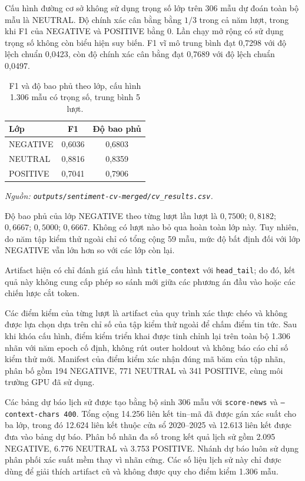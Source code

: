 \documentclass[12pt, a4paper, oneside]{report}
\begin{document}
Cấu hình đường cơ sở không sử dụng trọng số lớp trên 306 mẫu dự đoán toàn bộ mẫu là
NEUTRAL. Độ chính xác cân bằng bằng $1/3$ trong cả năm lượt, trong khi F1 của NEGATIVE và
POSITIVE bằng 0. Lần chạy mở rộng có sử dụng trọng số không còn biểu hiện suy biến. F1 vĩ
mô trung bình đạt 0,7298 với độ lệch chuẩn 0,0423, còn độ chính xác cân bằng đạt 0,7689
với độ lệch chuẩn 0,0497.

\begin{table}[H]
  \centering
  \caption{F1 và độ bao phủ theo lớp, cấu hình 1.306 mẫu có trọng số, trung bình 5 lượt.}
  \label{tab:kq-sentiment-class}
  \begin{tabular}{l c c}
    \toprule
    Lớp & F1 & Độ bao phủ \\
    \midrule
    NEGATIVE & 0,6036 & 0,6803 \\
    NEUTRAL & 0,8816 & 0,8359 \\
    POSITIVE & 0,7041 & 0,7906 \\
    \bottomrule
  \end{tabular}
\noindent\textit{Nguồn: \texttt{outputs/sentiment-cv-merged/cv\_results.csv}.}
\end{table}

Độ bao phủ của lớp NEGATIVE theo từng lượt lần lượt là $0{,}7500$; $0{,}8182$;
$0{,}6667$; $0{,}5000$; $0{,}6667$. Không có lượt nào bỏ qua hoàn toàn lớp này. Tuy
nhiên, do năm tập kiểm thử ngoài chỉ có tổng cộng 59 mẫu, mức độ bất định đối với lớp
NEGATIVE vẫn lớn hơn so với các lớp còn lại.

Artifact hiện có chỉ đánh giá cấu hình \texttt{title\_context} với
\texttt{head\_tail}; do đó, kết quả này không cung cấp phép so sánh mới giữa các phương án
đầu vào hoặc các chiến lược cắt token.

Các điểm kiểm của từng lượt là artifact của quy trình xác thực chéo và không được lựa chọn
dựa trên chỉ số của tập kiểm thử ngoài để chấm điểm tin tức. Sau khi khóa cấu hình, điểm
kiểm triển khai được tinh chỉnh lại trên toàn bộ 1.306 nhãn với năm epoch cố định, không
rút outer holdout và không báo cáo chỉ số kiểm thử mới. Manifest của điểm kiểm xác nhận
đúng mã băm của tập nhãn, phân bố gồm 194 NEGATIVE, 771 NEUTRAL và 341 POSITIVE, cùng
môi trường GPU đã sử dụng.

Các bảng dự báo lịch sử được tạo bằng bộ sinh 306 mẫu với \texttt{score-news} và
\texttt{--context-chars 400}. Tổng cộng 14.256 liên kết tin--mã đã được gán xác suất cho
ba lớp, trong đó 12.624 liên kết thuộc cửa sổ 2020--2025 và 12.613 liên kết được đưa vào
bảng dự báo. Phân bố nhãn đa số trong kết quả lịch sử gồm 2.095 NEGATIVE, 6.776 NEUTRAL
và 3.753 POSITIVE. Nhánh dự báo luôn sử dụng phân phối xác suất mềm thay vì nhãn cứng.
Các số liệu lịch sử này chỉ được dùng để giải thích artifact cũ và không được quy cho điểm
kiểm 1.306 mẫu.
\end{document}
